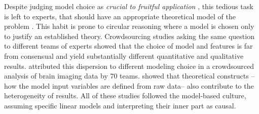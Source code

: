 \documentclass[french,12pt,twoside,a4paper]{book}
\begin{document}
Despite judging model choice as \textit{crucial to fruitful application}
\citep{cox2006principles}, this tedious task is left to experts, that should have an
appropriate theoretical model of the problem \citep{cox2001statistical}. This
habit is prone to circular reasoning where a model is chosen only to justify an
established theory. Crowdsourcing studies asking the same question to
different teams of experts showed that the choice of model and features is far
from consensual and yield substantially different quantitative and qualitative
results. \cite{botvinik2020variability} attributed this dispersion to different
modeling choice in a crowdsourced analysis of brain imaging data by 70 teams.
\cite{schweinsberg2021same} showed that theoretical constructs --how the
model input variables are defined from raw data-- also contribute to the heterogeneity of results.
All of these studies followed the model-based culture, assuming specific linear
models and interpreting their inner part as causal.

\end{document}
